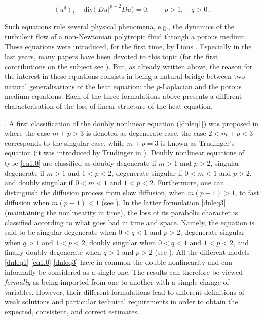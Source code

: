 \documentclass[a4paper,11pt,fullpage]{article}
\numberwithin{equation}{section}
\begin{document}
\begin{equation}\label{dnleq3}
(u^q)_t-\textrm{div} \big(|Du|^{p-2} Du\big)=0 , \qquad p>1, \quad q>0  \ .
\end{equation}

\noindent Such equations rule several physical phenomena, e.g., the dynamics of
the turbulent flow of a non-Newtonian polytropic fluid through a
porous medium. These equations  were introduced, for the first time,
by Lions \cite{Li}. Especially in the last years,
many papers have been devoted to this topic (for the first contributions
on the subject see  \cite{Ka}). But, as already written above, the
reason for the interest in these equations consists in being
 a natural bridge between two natural generalisations of the heat
equation: the $p$-Laplacian and the porous medium equations. Each of the three formulations above presents a different characterisation of the loss of linear structure of the heat equation. 

\vskip0.2cm . A first classification of the doubly nonlinear equation (\ref{dnleq1}) was proposed in \cite{Vespri2} where the case $m+p>3$ is denoted as degenerate case, the case $2<m+p<3$ corresponds to the singular case, while $m+p=3$  is known as Trudinger's equation (it was introduced by Trudinger in \cite{T68}). Doubly nonlinear equations of type \eqref{eq1.0} are classified as doubly degenerate if $m > 1$ and $p > 2$, singular-degenerate if $m > 1$ and $1<p<2$, degenerate-singular if $0<m<1$ and $p > 2$, and doubly singular if $0<m<1$ and $1<p<2$. Furthermore, one can distinguish the diffusion process from slow diffusion, when $ m(p-1)>1$, to fast diffusion  when $m(p-1)<1$ (see \cite{BHSS21}).  In the latter formulation \eqref{dnleq3} (maintaining the nonlinearity in time), the loss of its parabolic character is classified according to what goes bad in time and space. Namely, the equation is said to be singular-degenerate when $0<q<1$ and $p>2$, degenerate-singular when $q>1$ and $1<p<2$, doubly singular when $0<q<1$ and $1<p<2$, and finally doubly degenerate when $q>1$ and $p>2$ (see  \cite{HenrLal13, EH20, EH21, EH23}). 
 All the different models \eqref{dnleq1}-\eqref{eq1.0}-\eqref{dnleq3} have in common the double nonlinearity and can informally be considered as a single one. The results can therefore be viewed {\it formally} as being imported from one to another with a simple change of variables. However, their different formulations lead to different definitions of weak solutions and particular technical requirements in order to obtain the expected, consistent, and correct estimates. 
 
\end{document}

